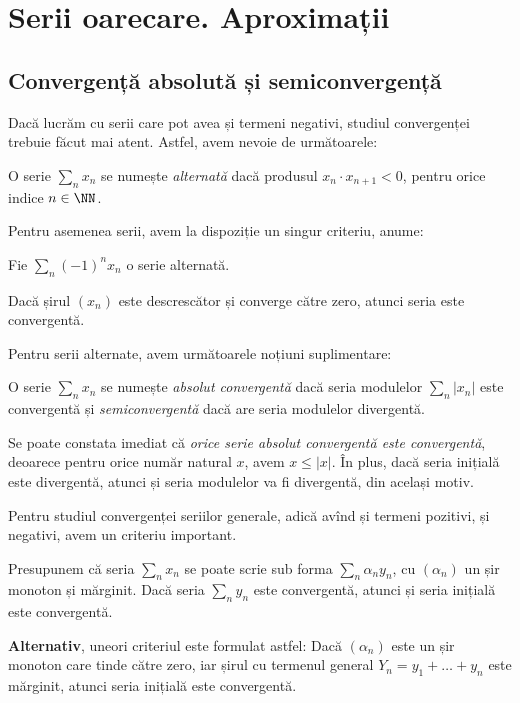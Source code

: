 \chapter{Serii oarecare. Aproximații}


\section{Convergență absolută și semiconvergență}

Dacă lucrăm cu serii care pot avea și termeni negativi, studiul convergenței
trebuie făcut mai atent. Astfel, avem nevoie de următoarele:

\begin{definition}\label{def:serie-alt} 
  O serie $ \sum_n x_n $ se numește \emph{alternată} dacă produsul $ x_n \cdot x_{n+1} < 0 $,
  pentru orice indice $ n \in \NN $.
\end{definition}

Pentru asemenea serii, avem la dispoziție un singur criteriu, anume:

\begin{theorem}\label{thm:leibniz} 
  Fie $ \sum_n (-1)^n x_n $ o serie alternată.

  Dacă șirul $ (x_n) $ este descrescător și converge către zero, atunci seria
  este convergentă.
\end{theorem}

Pentru serii alternate, avem următoarele noțiuni suplimentare:

\begin{definition}\label{def:ac-sc} 
  O serie $ \sum_n x_n $ se numește \emph{absolut convergentă} dacă seria modulelor
  $ \sum_n |x_n| $ este convergentă și \emph{semiconvergentă} dacă are seria
  modulelor divergentă.
\end{definition}

Se poate constata imediat că \emph{orice serie absolut convergentă este convergentă},
deoarece pentru orice număr natural $ x $, avem $ x \leq |x| $. În plus, dacă
seria inițială este divergentă, atunci și seria modulelor va fi divergentă, din
același motiv.

Pentru studiul convergenței seriilor generale, adică avînd și termeni pozitivi,
și negativi, avem un criteriu important.

\begin{theorem}\label{thm:crit-abel} 
  Presupunem că seria $ \sum_n x_n $ se poate scrie sub forma $ \sum_n \alpha_n y_n $, cu
  $ (\alpha_n) $ un șir monoton și mărginit. Dacă seria $ \sum_n y_n $ este convergentă,
  atunci și seria inițială este convergentă.

  \textbf{Alternativ}, uneori criteriul este formulat astfel:
  Dacă $ (\alpha_n) $ este un șir monoton care tinde către zero, iar
  șirul cu termenul general $ Y_n = y_1 + \dots + y_n $ este mărginit, atunci seria
  inițială este convergentă.
\end{theorem}

